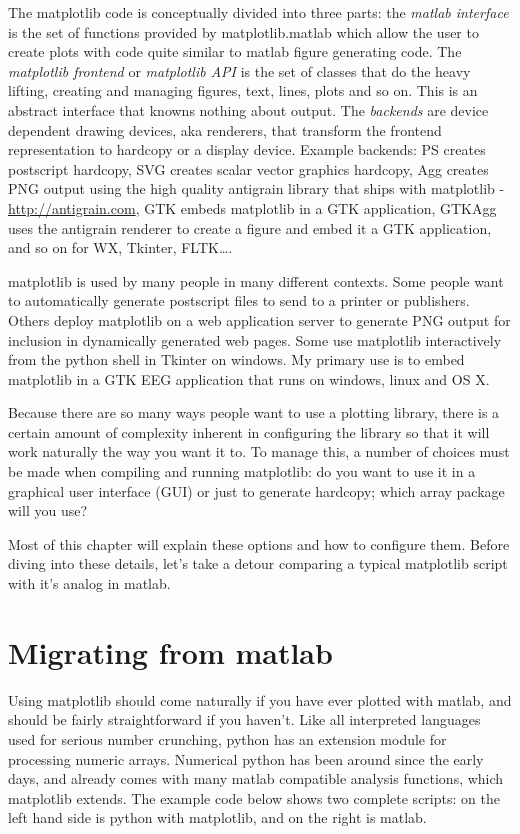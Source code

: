 \documentclass[twoside]{book}
\begin{document}
The matplotlib code is conceptually divided into three parts: the
\textit{matlab interface} is the set of functions provided by
matplotlib.matlab which allow the user to create plots with code quite
similar to matlab figure generating code.  The \textit{matplotlib
  frontend} or \textit{matplotlib API} is the set of classes that do
the heavy lifting, creating and managing figures, text, lines, plots
and so on.  This is an abstract interface that knowns nothing about
output.  The \textit{backends} are device dependent drawing devices,
aka renderers, that transform the frontend representation to hardcopy
or a display device.  Example backends: PS creates postscript
hardcopy, SVG creates scalar vector graphics hardcopy, Agg creates PNG
output using the high quality antigrain library that ships with
matplotlib - \url{http://antigrain.com}, GTK embeds matplotlib in a
GTK application, GTKAgg uses the antigrain renderer to create a figure
and embed it a GTK application, and so on for WX, Tkinter, FLTK\dots.

matplotlib is used by many people in many different contexts.  Some
people want to automatically generate postscript files to send to a
printer or publishers.  Others deploy matplotlib on a web application
server to generate PNG output for inclusion in dynamically generated
web pages.  Some use matplotlib interactively from the python shell in
Tkinter on windows.  My primary use is to embed matplotlib in a GTK
EEG application that runs on windows, linux and OS X.

Because there are so many ways people want to use a plotting library,
there is a certain amount of complexity inherent in configuring the
library so that it will work naturally the way you want it to.  To
manage this, a number of choices must be made when compiling and
running matplotlib: do you want to use it in a graphical user
interface (GUI) or just to generate hardcopy; which array package will
you use?  

Most of this chapter will explain these options and how to configure
them.  Before diving into these details, let's take a detour comparing
a typical matplotlib script with it's analog in matlab.

\section{Migrating from matlab}
\label{sec:migrating}

Using matplotlib should come naturally if you have ever plotted with
matlab, and should be fairly straightforward if you haven't.  Like all
interpreted languages used for serious number crunching, python has an
extension module for processing numeric arrays.  Numerical python has
been around since the early days, and already comes with many matlab
compatible analysis functions, which matplotlib extends.  The example
code below shows two complete scripts: on the left hand side is python
with matplotlib, and on the right is matlab.  
\end{document}
